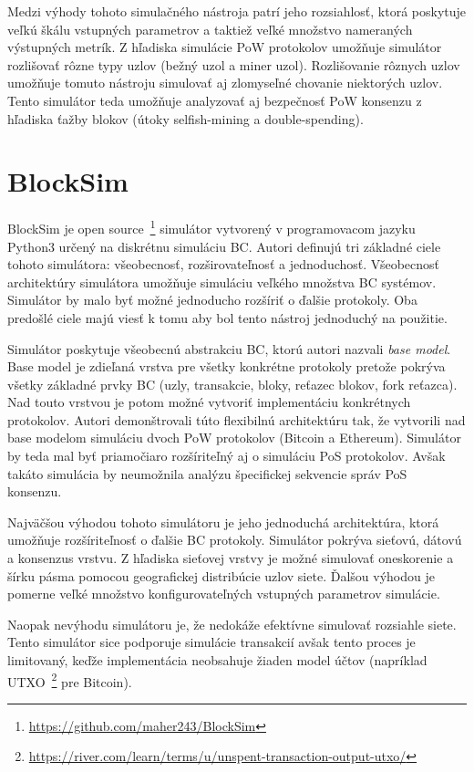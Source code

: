 Medzi výhody tohoto simulačného nástroja patrí jeho rozsiahlosť, ktorá poskytuje veľkú škálu vstupných parametrov a taktiež veľké množstvo nameraných výstupných metrík. Z hľadiska simulácie PoW protokolov umožňuje simulátor rozlišovať rôzne typy uzlov (bežný uzol a miner uzol). Rozlišovanie rôznych uzlov umožňuje tomuto nástroju simulovať aj zlomyseľné chovanie niektorých uzlov. Tento simulátor teda umožňuje analyzovať aj bezpečnosť PoW konsenzu z hľadiska ťažby blokov (útoky selfish-mining a double-spending).~\cite{fanPerfEval}

\section{BlockSim}\label{sec:blocksim}

BlockSim je open source~\footnote{\url{https://github.com/maher243/BlockSim}} simulátor vytvorený v programovacom jazyku Python3 určený na diskrétnu simuláciu BC. Autori definujú tri základné ciele tohoto simulátora: všeobecnosť, rozširovateľnosť a jednoduchosť. Všeobecnosť architektúry simulátora umožňuje simuláciu veľkého množstva BC systémov. Simulátor by malo byť možné jednoducho rozšíriť o ďalšie protokoly. Oba predošlé ciele majú viesť k tomu aby bol tento nástroj jednoduchý na použitie. 

Simulátor poskytuje všeobecnú abstrakciu BC, ktorú autori nazvali \textit{base model}. Base model je zdieľaná vrstva pre všetky konkrétne protokoly pretože pokrýva všetky základné prvky BC (uzly, transakcie, bloky, reťazec blokov, fork reťazca). Nad touto vrstvou je potom možné vytvoriť implementáciu konkrétnych protokolov. Autori demonštrovali túto flexibilnú architektúru tak, že vytvorili nad base modelom simuláciu dvoch PoW protokolov (Bitcoin a Ethereum). Simulátor by teda mal byť priamočiaro rozšíriteľný aj o simuláciu PoS protokolov. Avšak takáto simulácia by neumožnila analýzu špecifickej sekvencie správ PoS konsenzu.~\cite{blocksimWp}	

Najväčšou výhodou tohoto simulátoru je jeho jednoduchá architektúra, ktorá umožňuje rozšíriteľnosť o ďalšie BC protokoly. Simulátor pokrýva sieťovú, dátovú a konsenzus vrstvu. Z hľadiska sieťovej vrstvy je možné simulovať oneskorenie a šírku pásma pomocou geografickej distribúcie uzlov siete. Ďalšou výhodou je pomerne veľké množstvo konfigurovateľných vstupných parametrov simulácie. 

Naopak nevýhodu simulátoru je, že nedokáže efektívne simulovať rozsiahle siete. Tento simulátor sice podporuje simulácie transakcií avšak tento proces je limitovaný, keďže implementácia neobsahuje žiaden model účtov (napríklad UTXO~\footnote{\url{https://river.com/learn/terms/u/unspent-transaction-output-utxo/}} pre Bitcoin).~\cite{fanPerfEval}

